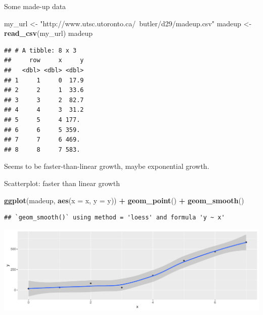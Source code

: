 \documentclass[
  ignorenonframetext,
]{beamer}
\newenvironment{Shaded}{\begin{snugshade}}{\end{snugshade}}
\newcommand{\DataTypeTok}[1]{\textcolor[rgb]{0.13,0.29,0.53}{#1}}
\newcommand{\KeywordTok}[1]{\textcolor[rgb]{0.13,0.29,0.53}{\textbf{#1}}}
\newcommand{\NormalTok}[1]{#1}
\newcommand{\OperatorTok}[1]{\textcolor[rgb]{0.81,0.36,0.00}{\textbf{#1}}}
\newcommand{\StringTok}[1]{\textcolor[rgb]{0.31,0.60,0.02}{#1}}
\begin{document}
\begin{frame}[fragile]{Some made-up data}
\protect\hypertarget{some-made-up-data}{}

\begin{Shaded}
\begin{Highlighting}[]
\NormalTok{my_url <-}\StringTok{ "http://www.utsc.utoronto.ca/~butler/d29/madeup.csv"}
\NormalTok{madeup <-}\StringTok{ }\KeywordTok{read_csv}\NormalTok{(my_url)}
\NormalTok{madeup}
\end{Highlighting}
\end{Shaded}

\begin{verbatim}
## # A tibble: 8 x 3
##     row     x     y
##   <dbl> <dbl> <dbl>
## 1     1     0  17.9
## 2     2     1  33.6
## 3     3     2  82.7
## 4     4     3  31.2
## 5     5     4 177. 
## 6     6     5 359. 
## 7     7     6 469. 
## 8     8     7 583.
\end{verbatim}

Seems to be faster-than-linear growth, maybe exponential growth.

\end{frame}

\begin{frame}[fragile]{Scatterplot: faster than linear growth}
\protect\hypertarget{scatterplot-faster-than-linear-growth}{}

\begin{Shaded}
\begin{Highlighting}[]
\KeywordTok{ggplot}\NormalTok{(madeup, }\KeywordTok{aes}\NormalTok{(}\DataTypeTok{x =}\NormalTok{ x, }\DataTypeTok{y =}\NormalTok{ y)) }\OperatorTok{+}\StringTok{ }\KeywordTok{geom_point}\NormalTok{() }\OperatorTok{+}
\StringTok{  }\KeywordTok{geom_smooth}\NormalTok{()}
\end{Highlighting}
\end{Shaded}

\begin{verbatim}
## `geom_smooth()` using method = 'loess' and formula 'y ~ x'
\end{verbatim}

\includegraphics{slides_d29_files/figure-beamer/dsljhsdjlhf-1.pdf}

\end{frame}
\end{document}
